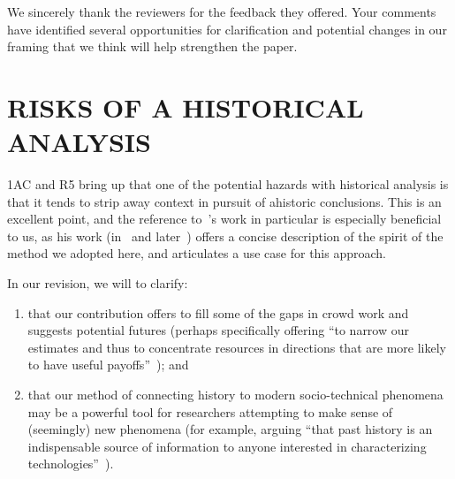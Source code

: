 \documentclass[11pt]{article}
\begin{document}
We sincerely thank the reviewers for the feedback they offered. Your comments have identified several opportunities for clarification and potential changes in our framing that we think will help strengthen the paper.

\section{RISKS OF A HISTORICAL ANALYSIS}
1AC and R5 bring up that one of the potential hazards with
historical analysis is that
it tends to strip away context in pursuit of ahistoric conclusions.
This is an excellent point, and
the reference to~\citeauthor{rosenberg1994exploring}'s
work in particular is especially beneficial to us, as his work
(in~\citeyear{rosenberg1982inside} and later~\citeyear{rosenberg1994exploring})
offers a concise description of the spirit of the method we adopted here,
and articulates a use case for this approach.

In our revision, we will to clarify:
\begin{enumerate}
  \item that our contribution offers to fill some of the gaps in crowd work and suggests potential futures
        (perhaps specifically offering
            ``to narrow our estimates
              and thus to concentrate resources
              in directions that are more likely to have useful payoffs''~\cite{rosenberg1994exploring});
  and
  \item that our method of connecting history to modern socio-technical phenomena may be
        a powerful tool for researchers attempting
        to make sense of (seemingly) new phenomena
        (for example,
        arguing ``that past history is
                  an indispensable source of information
                  to anyone interested in characterizing technologies''~\cite{rosenberg1982inside}).
\end{enumerate}


\end{document}
